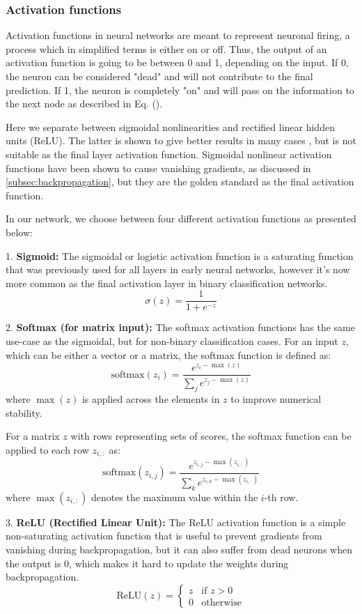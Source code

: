 \subsubsection{Activation functions}\label{sssec:activation_functions}

Activation functions in neural networks are meant to represent neuronal firing, a process which in simplified terms is either on or off. Thus, the output 
of an activation function is going to be between 0 and 1, depending on the input. If 0, the neuron can be considered "dead" and will not contribute 
to the final prediction. If 1, the neuron is completely "on" and will pass on the information to the next node as described in Eq. (\cite{ffnn}). 

Here we separate between sigmoidal nonlinearities and rectified linear hidden units (ReLU). The latter is shown to give better results in many cases 
\cite{relu_best_ever}, but is not suitable as the final layer activation function. Sigmoidal nonlinear activation functions have been shown to 
cause vanishing gradients, as discussed in \ref{subsec:backpropagation}, but they are the golden standard as the final activation function. 

In our network, we choose between four different activation functions as presented below: 

1. \textbf{Sigmoid:}
The sigmoidal or logistic activation function is a saturating function that was previously used for all layers in early neural networks, 
however it's now more common as the final activation layer in binary classification networks.
\[
\sigma(z) = \frac{1}{1 + e^{-z}}
\]

2. \textbf{Softmax (for matrix input):}
The softmax activation functions has the same use-case as the sigmoidal, but for non-binary classification cases. 
For an input \( z \), which can be either a vector or a matrix, the softmax function is defined as:
\[
\text{softmax}(z_i) = \frac{e^{z_i - \max(z)}}{\sum_{j} e^{z_j - \max(z)}}
\]
where \(\max(z)\) is applied across the elements in \( z \) to improve numerical stability.

For a matrix \( z \) with rows representing sets of scores, the softmax function can be applied to each row \( z_{i,:} \) as:
\[
\text{softmax}(z_{i,j}) = \frac{e^{z_{i,j} - \max(z_{i,:})}}{\sum_{k} e^{z_{i,k} - \max(z_{i,:})}}
\]
where \( \max(z_{i,:}) \) denotes the maximum value within the \( i \)-th row.


3. \textbf{ReLU (Rectified Linear Unit):}
The ReLU activation function is a simple non-saturating activation function that is useful to prevent gradients from vanishing during backpropagation, 
but it can also suffer from dead neurons when the output is 0, which makes it hard to update the weights during backpropagation.  
\[
\text{ReLU}(z) = 
\begin{cases} 
   z & \text{if } z > 0 \\
   0 & \text{otherwise}
\end{cases}
\]

